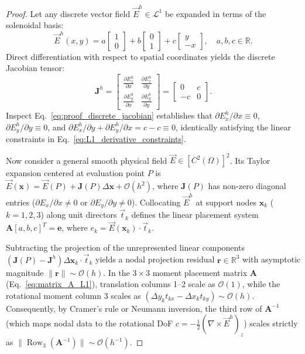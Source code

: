 \documentclass[preprint,12pt]{elsarticle}
\begin{document}
\begin{proof}
Let any discrete vector field $\vec{E}^h \in \mathcal{L}^1$ be expanded in terms of the solenoidal basis:
\begin{equation}
\vec{E}^h(x, y) = a \begin{bmatrix} 1 \\ 0 \end{bmatrix} + b \begin{bmatrix} 0 \\ 1 \end{bmatrix} + c \begin{bmatrix} y \\ -x \end{bmatrix}, \quad a, b, c \in \mathbb{R}.
\label{eq:proof_L1_expansion}
\end{equation}
Direct differentiation with respect to spatial coordinates yields the discrete Jacobian tensor:
\begin{equation}
\mathbf{J}^h = \begin{bmatrix} 
\frac{\partial E_x^h}{\partial x} & \frac{\partial E_x^h}{\partial y} \\[4pt] 
\frac{\partial E_y^h}{\partial x} & \frac{\partial E_y^h}{\partial y} 
\end{bmatrix} = \begin{bmatrix} 
0 & c \\ 
-c & 0 
\end{bmatrix}.
\label{eq:proof_discrete_jacobian}
\end{equation}
Inspect Eq.~\eqref{eq:proof_discrete_jacobian} establishes that $\partial E_x^h/\partial x \equiv 0$, $\partial E_y^h/\partial y \equiv 0$, and $\partial E_x^h/\partial y + \partial E_y^h/\partial x = c - c \equiv 0$, identically satisfying the linear constraints in Eq.~\eqref{eq:L1_derivative_constraints}.

Now consider a general smooth physical field $\vec{E} \in [C^2(\Omega)]^2$. Its Taylor expansion centered at evaluation point $P$ is $\vec{E}(\mathbf{x}) = \vec{E}(P) + \mathbf{J}(P) \Delta\mathbf{x} + \mathcal{O}(h^2)$, where $\mathbf{J}(P)$ has non-zero diagonal entries ($\partial E_x/\partial x \neq 0$ or $\partial E_y/\partial y \neq 0$). Collocating $\vec{E}^h$ at support nodes $\mathbf{x}_k$ ($k=1,2,3$) along unit directors $\vec{t}_k$ defines the linear placement system $\mathbf{A} [a, b, c]^T = \mathbf{e}$, where $e_k = \vec{E}(\mathbf{x}_k) \cdot \vec{t}_k$.

Subtracting the projection of the unrepresented linear components $(\mathbf{J}(P) - \mathbf{J}^h) \Delta\mathbf{x}_k \cdot \vec{t}_k$ yields a nodal projection residual $\mathbf{r} \in \mathbb{R}^3$ with asymptotic magnitude $\|\mathbf{r}\| \sim \mathcal{O}(h)$. In the $3 \times 3$ moment placement matrix $\mathbf{A}$ (Eq.~\eqref{eq:matrix_A_L1}), translation columns 1--2 scale as $\mathcal{O}(1)$, while the rotational moment column 3 scales as $(\Delta y_k t_{kx} - \Delta x_k t_{ky}) \sim \mathcal{O}(h)$. Consequently, by Cramer's rule or Neumann inversion, the third row of $\mathbf{A}^{-1}$ (which maps nodal data to the rotational DoF $c = -\frac{1}{2}(\nabla \times \vec{E}^h)_z$) scales strictly as $\|\operatorname{Row}_3(\mathbf{A}^{-1})\| \sim \mathcal{O}(h^{-1})$.


\end{proof}
\end{document}
